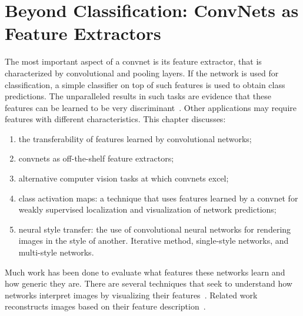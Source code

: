 \chapter{Beyond Classification: ConvNets as Feature Extractors}\label{chap:style}
The most important aspect of a convnet is its feature extractor, that is characterized by convolutional and pooling layers. If the network is used for classification, a simple classifier on top of such features is used to obtain class predictions. The unparalleled results in such tasks are evidence that these features can be learned to be very discriminant~\cite{krizhevsky2012imagenet,simonyan2014very,szegedy2015going,he2016deep}. Other applications may require features with different characteristics. This chapter discusses:
\begin{enumerate}
	\item the transferability of features learned by convolutional networks;
	\item convnets as off-the-shelf feature extractors;
	\item alternative computer vision tasks at which convnets excel;
	\item class activation maps: a technique that uses features learned by a convnet for weakly supervised localization and visualization of network predictions;
	\item neural style transfer: the use of convolutional neural networks for rendering images in the style of another. Iterative method, single-style networks, and multi-style networks.
\end{enumerate}

Much work has been done to evaluate what features these networks learn and how generic they are. There are several techniques that seek to understand how networks interpret images by visualizing their features~\cite{zeiler2014visualizing,simonyan2014deep,yosinski2015understanding}. Related work reconstructs images based on their feature description~\cite{mahendran2015understanding}.

